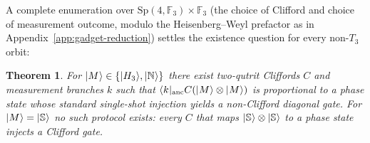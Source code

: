 \documentclass[11pt]{article}
\newtheorem{theorem}{Theorem}
\theoremstyle{definition}
\newcommand{\microspace}{\mspace{0.5mu}}
\newcommand{\ket}[1]{\lvert\microspace #1 \microspace \rangle}
\newcommand{\bra}[1]{\langle\microspace #1 \microspace \rvert}
\newcommand{\F}{\mathcal{F}}
\renewcommand{\F}[1]{\mathbb{F}_{#1}}
\newcommand{\Strange}{\ket{\mathbb{S}}}
\newcommand{\Hth}{\ket{H_3}}
\newcommand{\Norrell}{\ket{\mathbb{N}}}
\newcommand{\Sp}{\mathrm{Sp}}
\begin{document}
	A complete enumeration over $\Sp(4, \F{3}) \times \F{3}$ (the
	choice of Clifford and choice of measurement outcome, modulo the
	Heisenberg--Weyl prefactor as in
	Appendix~\ref{app:gadget-reduction}) settles the existence question
	for every non-$T_3$ orbit:

	\begin{theorem}\label{thm:two-copy}
		For $\ket{M} \in \{\Hth, \Norrell\}$ there exist two-qutrit
		Cliffords $C$ and measurement branches $k$ such that
		$\bra{k}_{\mathrm{anc}} C (\ket{M} \otimes \ket{M})$ is proportional
		to a phase state whose standard single-shot injection yields a
		non-Clifford diagonal gate. For $\ket{M} = \Strange$ no such
		protocol exists: every $C$ that maps $\Strange \otimes \Strange$
		to a phase state injects a Clifford gate.
	\end{theorem}
\end{document}
